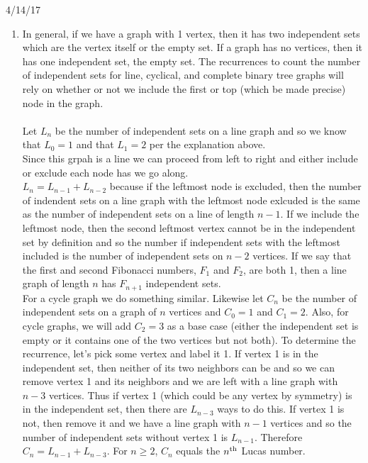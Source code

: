 \documentclass{article}
\begin{document}
	
 \hspace{5.5in} 4/14/17\\

\begin{enumerate}
	\item In general, if we have a graph with 1 vertex, then it has two independent sets which are the vertex itself or the empty set.  If a graph has no vertices, then it has one independent set, the empty set. The recurrences to count the number of independent sets for line, cyclical, and complete binary tree graphs will rely on whether or not we include the first or top (which be made precise) node in the graph. \\\\
	Let $L_n$ be the number of independent sets on a line graph and so we know that $L_0 = 1$ and that $L_1 = 2$ per the explanation above. \\
	Since this grpah is a line we can proceed from left to right and either include or exclude each node has we go along.  \\
	$L_n = L_{n-1} + L_{n-2}$ because if the leftmost node is excluded, then the number of indendent sets  on a line graph with the leftmost node exlcuded is the same as the number of independent sets on a line of length $n-1$.  If we include the leftmost node, then the second leftmost vertex cannot be in the independent set by definition and so the number if independent sets with the leftmost included is the number of independent sets on $n-2$ vertices. If we say that the first and second Fibonacci numbers, $F_1$ and $F_2$, are both 1, then a line graph of length $n$ has $F_{n+1}$ independent sets.  \\
	
	For a cycle graph we do something similar.  Likewise let $C_n$ be the number of independent sets on a graph of $n$ vertices and $C_0 = 1$ and $C_1 = 2$.  Also, for cycle graphs, we will add $C_2 = 3$ as a base case (either the independent set is empty or it contains one of the two vertices but not both).  To determine the recurrence, let's pick some vertex and label it 1.  If vertex 1 is in the independent set, then neither of its two neighbors can be and so we can remove vertex 1 and its neighbors and we are left with a line graph with $n-3$ vertices.  Thus if vertex 1 (which could be any vertex by symmetry) is in the independent set, then there are $L_{n-3}$ ways to do this.  If vertex 1 is not, then remove it and we have a line graph with $n-1$ vertices and so the number of independent sets without vertex 1 is $L_{n-1}$.  Therefore $C_n = L_{n-1} + L_{n-3}$.  For $n\geq 2$, $C_n$ equals the $n^{\textup{th}}$ Lucas number.\\
	

\end{enumerate}
\end{document}
